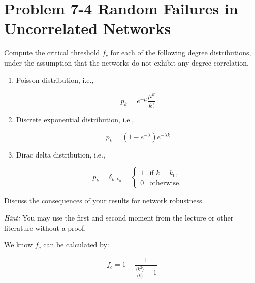 \section*{Problem 7-4 Random Failures in Uncorrelated Networks}

Compute the critical threshold $f_c$ for each of the following degree distributions, under the assumption that the
networks do not exhibit any degree correlation.

\begin{enumerate}
	\item Poisson distribution, i.e.,
	
	\begin{equation*}
		p_k = e^{-\mu}\frac{\mu^k}{k!}
	\end{equation*}

	\item Discrete exponential distribution, i.e.,
	
	\begin{equation*}
		p_k = (1 - e^{-\lambda})e^{-\lambda k}
	\end{equation*}

	\item Dirac delta distribution, i.e.,
	
	\begin{equation*}
		p_k = \delta_{k,k_0} = 
		\begin{cases}
			1 & \text{if $k = k_0$,} \\
			0 & \text{otherwise.}
		\end{cases}
	\end{equation*}
\end{enumerate}

\noindent
Discuss the consequences of your results for network robustness.

\noindent
\textit{Hint:} You may use the first and second moment from the lecture or other literature without a proof. \newline

\noindent
We know $f_c$ can be calculated by:

\begin{equation*}
	f_c = 1 - \frac{1}{\frac{\langle k^2 \rangle}{\langle k \rangle} - 1}
\end{equation*}

